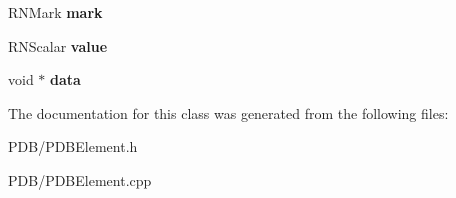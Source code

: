 \begin{DoxyCompactItemize}
\item 
R\+N\+Mark {\bfseries mark}\hypertarget{class_p_d_b_element_a86f498ff9a36a32cd6891443b9b0e2b7}{}\label{class_p_d_b_element_a86f498ff9a36a32cd6891443b9b0e2b7}

\item 
R\+N\+Scalar {\bfseries value}\hypertarget{class_p_d_b_element_a7454fee9317480e66707f91c90107389}{}\label{class_p_d_b_element_a7454fee9317480e66707f91c90107389}

\item 
void $\ast$ {\bfseries data}\hypertarget{class_p_d_b_element_a045be6db37e42eb0780b02c54496f5c4}{}\label{class_p_d_b_element_a045be6db37e42eb0780b02c54496f5c4}

\end{DoxyCompactItemize}


The documentation for this class was generated from the following files\+:\begin{DoxyCompactItemize}
\item 
P\+D\+B/P\+D\+B\+Element.\+h\item 
P\+D\+B/P\+D\+B\+Element.\+cpp\end{DoxyCompactItemize}
